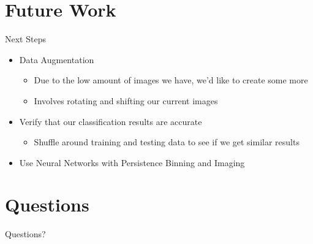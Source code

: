 \documentclass{beamer}
\begin{document}
\section{Future Work}
\begin{frame}{Next Steps}
    \begin{itemize}
        \item Data Augmentation
        \begin{itemize}
            \item Due to the low amount of images we have, we'd like to create some more
            \item Involves rotating and shifting our current images
        \end{itemize}
        \item Verify that our classification results are accurate
        \begin{itemize}
            \item Shuffle around training and testing data to see if we get similar results
        \end{itemize}
        \item Use Neural Networks with Persistence Binning and Imaging
    \end{itemize}
\end{frame}


\section{Questions}
\begin{frame}
    \centering
    \vfill
    {\Huge Questions?}
    \vfill
\end{frame}
\end{document}
